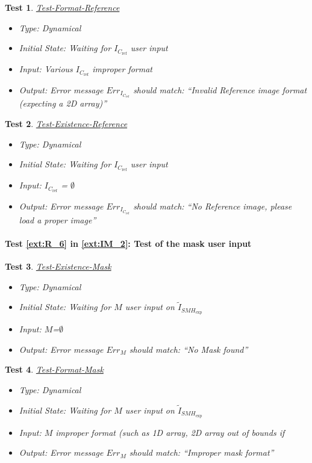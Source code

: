 \documentclass[12pt, titlepage]{article}
\newtheorem{Test}{Test}
\begin{document}
\begin{Test}\normalfont\underline{Test-Format-Reference}
\begin{itemize}
\item Type: Dynamical
\item Initial State: Waiting for $I_{C_{\text{ref}}}$ user input
\item Input: Various $I_{C_{\text{ref}}}$ improper format
\item Output: Error message $Err_{I_{C_{\text{ref}}}}$ should match: \enquote{Invalid Reference image format (expecting a 2D array)}
\end{itemize}
\end{Test}

\begin{Test}\normalfont\underline{Test-Existence-Reference}
\begin{itemize}
\item Type: Dynamical
\item Initial State: Waiting for $I_{C_{\text{ref}}}$ user input
\item Input: $I_{C_{\text{ref}}}$ = $\emptyset$
\item Output: Error message $Err_{I_{C_{\text{ref}}}}$ should match: \enquote{No Reference image, please load a proper image}
\end{itemize}
\end{Test}


\paragraph{Test \cref{ext:R_6} in \cref{ext:IM_2}: Test of the mask user input}

\begin{Test}\normalfont\underline{Test-Existence-Mask}
\begin{itemize}
\item Type: Dynamical
\item Initial State: Waiting for $M$ user input on $\widetilde{I}_{\mathit{SMH}_{\text{exp}}}$
\item Input: $M$=$\emptyset$
\item Output:  Error message $Err_{M}$ should match: \enquote{No Mask found}
\end{itemize}
\end{Test}

\begin{Test}\normalfont\underline{Test-Format-Mask}
\begin{itemize}
\item Type: Dynamical
\item Initial State: Waiting for $M$ user input on $\widetilde{I}_{\mathit{SMH}_{\text{exp}}}$
\item Input: $M$ improper format (such as 1D array, 2D array out of bounds if  
\item Output:  Error message $Err_{M}$ should match: \enquote{Improper mask format}
\end{itemize}
\end{Test}
\end{document}
